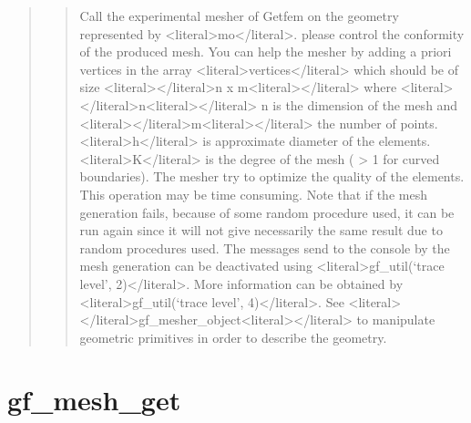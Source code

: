 \documentclass[a4paper,11pt,english]{sphinxmanual}
\begin{document}
\begin{quote}
\sphinxAtStartPar
{}
\begin{quote}

\sphinxAtStartPar
Call the experimental mesher of Getfem on the geometry
represented by \textless{}literal\textgreater{}mo\textless{}/literal\textgreater{}. please control the conformity of the produced mesh.
You can help the mesher by adding a priori vertices in the array
\textless{}literal\textgreater{}vertices\textless{}/literal\textgreater{} which should be of size \textless{}literal\textgreater{}\textless{}/literal\textgreater{}n x m\textless{}literal\textgreater{}\textless{}/literal\textgreater{} where \textless{}literal\textgreater{}\textless{}/literal\textgreater{}n\textless{}literal\textgreater{}\textless{}/literal\textgreater{} n is the
dimension of the mesh and \textless{}literal\textgreater{}\textless{}/literal\textgreater{}m\textless{}literal\textgreater{}\textless{}/literal\textgreater{} the number of points. \textless{}literal\textgreater{}h\textless{}/literal\textgreater{} is
approximate diameter of the elements. \textless{}literal\textgreater{}K\textless{}/literal\textgreater{} is the degree of the
mesh ( \textgreater{} 1 for curved boundaries).  The mesher try to optimize the
quality of the elements. This operation may be time consuming.
Note that if the mesh generation fails, because of some random
procedure used, it can be run again since it will not give necessarily
the same result due to random procedures used.
The messages send to the console by the mesh generation can be
deactivated using \textless{}literal\textgreater{}gf\_util(‘trace level’, 2)\textless{}/literal\textgreater{}. More information
can be obtained by \textless{}literal\textgreater{}gf\_util(‘trace level’, 4)\textless{}/literal\textgreater{}. See \textless{}literal\textgreater{}\textless{}/literal\textgreater{}gf\_mesher\_object\textless{}literal\textgreater{}\textless{}/literal\textgreater{}
to manipulate geometric primitives in order to describe the geometry.
\end{quote}
\end{quote}


\section{gf\_mesh\_get}
\label{\detokenize{scilab/cmdref_gf_mesh_get:gf-mesh-get}}\label{\detokenize{scilab/cmdref_gf_mesh_get::doc}}
\sphinxAtStartPar
{}
\end{document}
